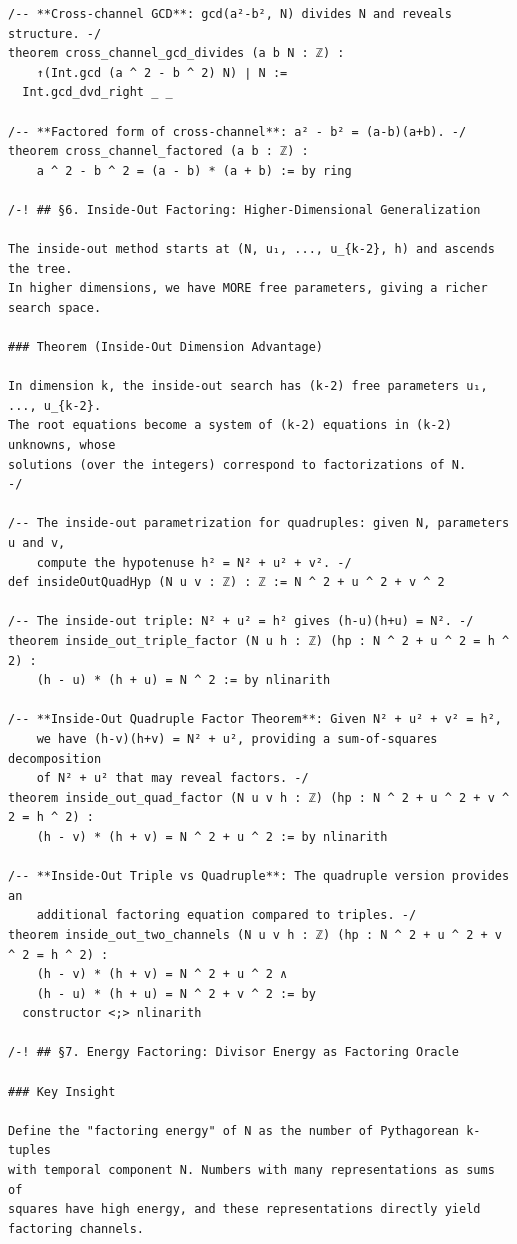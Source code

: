 \documentclass[11pt,openany]{book}
\theoremstyle{definition}
\theoremstyle{plain}
\theoremstyle{remark}
\begin{document}
\begin{lstlisting}[style=lean]
/-- **Cross-channel GCD**: gcd(a²-b², N) divides N and reveals structure. -/
theorem cross_channel_gcd_divides (a b N : ℤ) :
    ↑(Int.gcd (a ^ 2 - b ^ 2) N) ∣ N :=
  Int.gcd_dvd_right _ _

/-- **Factored form of cross-channel**: a² - b² = (a-b)(a+b). -/
theorem cross_channel_factored (a b : ℤ) :
    a ^ 2 - b ^ 2 = (a - b) * (a + b) := by ring

/-! ## §6. Inside-Out Factoring: Higher-Dimensional Generalization

The inside-out method starts at (N, u₁, ..., u_{k-2}, h) and ascends the tree.
In higher dimensions, we have MORE free parameters, giving a richer search space.

### Theorem (Inside-Out Dimension Advantage)

In dimension k, the inside-out search has (k-2) free parameters u₁, ..., u_{k-2}.
The root equations become a system of (k-2) equations in (k-2) unknowns, whose
solutions (over the integers) correspond to factorizations of N.
-/

/-- The inside-out parametrization for quadruples: given N, parameters u and v,
    compute the hypotenuse h² = N² + u² + v². -/
def insideOutQuadHyp (N u v : ℤ) : ℤ := N ^ 2 + u ^ 2 + v ^ 2

/-- The inside-out triple: N² + u² = h² gives (h-u)(h+u) = N². -/
theorem inside_out_triple_factor (N u h : ℤ) (hp : N ^ 2 + u ^ 2 = h ^ 2) :
    (h - u) * (h + u) = N ^ 2 := by nlinarith

/-- **Inside-Out Quadruple Factor Theorem**: Given N² + u² + v² = h²,
    we have (h-v)(h+v) = N² + u², providing a sum-of-squares decomposition
    of N² + u² that may reveal factors. -/
theorem inside_out_quad_factor (N u v h : ℤ) (hp : N ^ 2 + u ^ 2 + v ^ 2 = h ^ 2) :
    (h - v) * (h + v) = N ^ 2 + u ^ 2 := by nlinarith

/-- **Inside-Out Triple vs Quadruple**: The quadruple version provides an
    additional factoring equation compared to triples. -/
theorem inside_out_two_channels (N u v h : ℤ) (hp : N ^ 2 + u ^ 2 + v ^ 2 = h ^ 2) :
    (h - v) * (h + v) = N ^ 2 + u ^ 2 ∧
    (h - u) * (h + u) = N ^ 2 + v ^ 2 := by
  constructor <;> nlinarith

/-! ## §7. Energy Factoring: Divisor Energy as Factoring Oracle

### Key Insight

Define the "factoring energy" of N as the number of Pythagorean k-tuples
with temporal component N. Numbers with many representations as sums of
squares have high energy, and these representations directly yield
factoring channels.


\end{lstlisting}
\end{document}
